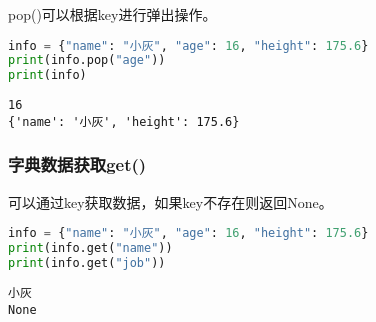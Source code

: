 pop()可以根据key进行弹出操作。\\


\begin{lstlisting}[language=Python]
info = {"name": "小灰", "age": 16, "height": 175.6}
print(info.pop("age"))
print(info)
\end{lstlisting}

\begin{tcolorbox}
	\begin{verbatim}
16
{'name': '小灰', 'height': 175.6}
\end{verbatim}
\end{tcolorbox}

\subsubsection{字典数据获取get()}

可以通过key获取数据，如果key不存在则返回None。\\


\begin{lstlisting}[language=Python]
info = {"name": "小灰", "age": 16, "height": 175.6}
print(info.get("name"))
print(info.get("job"))
\end{lstlisting}

\begin{tcolorbox}
	\begin{verbatim}
小灰
None
\end{verbatim}
\end{tcolorbox}

\newpage